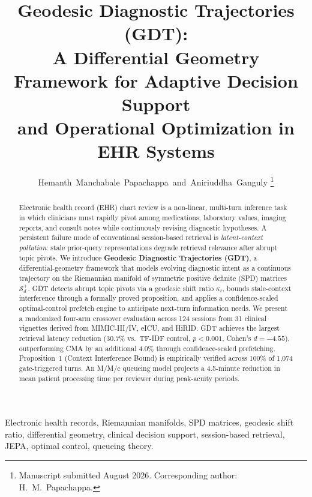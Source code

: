 \documentclass[journal,10pt,twoside]{IEEEtran}
\begin{document}
\title{Geodesic Diagnostic Trajectories (GDT):\\
A Differential Geometry Framework for Adaptive Decision Support\\
and Operational Optimization in EHR Systems}

\author{
  Hemanth~Manchabale~Papachappa~and~Aniriuddha~Ganguly%
  \thanks{Manuscript submitted August 2026. Corresponding author: H.~M.~Papachappa.}
}

\maketitle

\begin{abstract}
Electronic health record (EHR) chart review is a non-linear, multi-turn inference task in which clinicians must rapidly pivot among medications, laboratory values, imaging reports, and consult notes while continuously revising diagnostic hypotheses. A persistent failure mode of conventional session-based retrieval is \emph{latent-context pollution}: stale prior-query representations degrade retrieval relevance after abrupt topic pivots. We introduce \textbf{Geodesic Diagnostic Trajectories (GDT)}, a differential-geometry framework that models evolving diagnostic intent as a continuous trajectory on the Riemannian manifold of symmetric positive definite (SPD) matrices $\mathcal{S}_d^+$. GDT detects abrupt topic pivots via a geodesic shift ratio $\kappa_t$, bounds stale-context interference through a formally proved proposition, and applies a confidence-scaled optimal-control prefetch engine to anticipate next-turn information needs. We present a randomized four-arm crossover evaluation across 124 sessions from 31 clinical vignettes derived from MIMIC-III/IV, eICU, and HiRID. GDT achieves the largest retrieval latency reduction (30.7\% vs.\ TF-IDF control, $p{<}0.001$, Cohen's $d{=}{-4.55}$), outperforming CMA by an additional 4.0\% through confidence-scaled prefetching. Proposition~1 (Context Interference Bound) is empirically verified across 100\% of 1,074 gate-triggered turns. An M/M/c queueing model projects a 4.5-minute reduction in mean patient processing time per reviewer during peak-acuity periods.
\end{abstract}

\begin{IEEEkeywords}
Electronic health records, Riemannian manifolds, SPD matrices, geodesic shift ratio, differential geometry, clinical decision support, session-based retrieval, JEPA, optimal control, queueing theory.
\end{IEEEkeywords}
\end{document}
